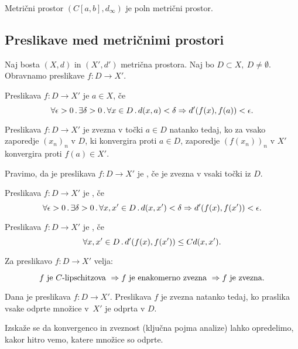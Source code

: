\begin{izrek}
    Metrični prostor $(C[a,b], d_\infty)$ je poln metrični prostor.
\end{izrek}

\subsection*{Preslikave med metričnimi prostori}
Naj bosta $(X, d)$ in $(X', d')$ metrična prostora. Naj bo $D \subset X, \ D \neq \emptyset$. Obravnamo preslikave $f: D \to X'$.

\begin{definicija}
    Preslikava $f: D \to X'$ je  $a \in X$, če
    $$\forall \epsilon > 0 \,.\, \exists \delta > 0 \,.\, \forall x \in D \,.\, d(x, a) < \delta \Rightarrow d'(f(x), f(a)) < \epsilon.$$
\end{definicija}

\begin{izrek}
    Preslikava $f: D \to X'$ je zvezna v točki $a \in D$ natanko tedaj, ko za vsako zaporedje $(x_n)_n$ v $D$, ki konvergira proti $a \in D$, zaporedje $(f(x_n))_n$ v $X'$ konvergira proti $f(a) \in X'$. 
\end{izrek}

\begin{definicija}
    Pravimo, da je preslikava $f: D \to X'$ je , če je zvezna v vsaki točki iz $D$.
\end{definicija}

\begin{definicija}
    Preslikava $f: D \to X'$ je , če
    $$\forall \epsilon > 0 \,.\, \exists \delta > 0 \,.\, \forall x, x' \in D \,.\, d(x, x') < \delta \Rightarrow d'(f(x), f(x')) < \epsilon.$$
\end{definicija}

\begin{definicija}
    Preslikava $f: D \to X'$ je , če
    $$\forall x, x' \in D \,.\, d'(f(x), f(x')) \leq Cd(x, x').$$
\end{definicija}

\begin{trditev}
    Za preslikavo $f: D \to X'$ velja:

    $$f \text{ je $C$-lipschitzova } \Rightarrow f \text{ je enakomerno zvezna } \Rightarrow f \text{ je zvezna}.$$
\end{trditev}

\begin{izrek}
    Dana je preslikava $f: D \to X'$. Preslikava $f$ je zvezna natanko tedaj, ko praslika vsake odprte množice v~$X'$ je odprta v $D$.
\end{izrek}

Izskaže se da konvergenco in zveznost (ključna pojma analize) lahko opredelimo, kakor hitro vemo, katere množice so odprte.